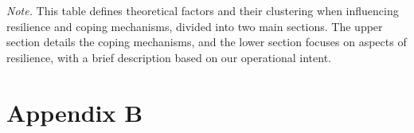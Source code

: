 \documentclass[
  man,floatsintext]{apa7}
\begin{document}
\begin{center}
\begin{ThreePartTable}
{}

\end{ThreePartTable}
\end{center}

\vspace{-55pt}

\noindent  
\emph{Note.} This table defines theoretical factors and their clustering when influencing resilience and coping mechanisms, divided into two main sections. The upper section details the coping mechanisms, and the lower section focuses on aspects of resilience, with a brief description based on our operational intent. \normalsize \singlespacing \doublespacing

\section{Appendix B}\label{appendixb}
\end{document}
